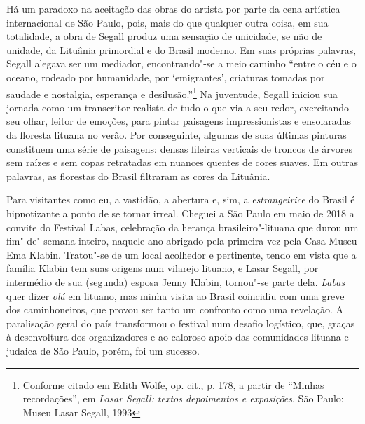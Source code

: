 Há um paradoxo na aceitação das obras do artista por parte da
cena artística internacional de São Paulo, pois, mais do que qualquer
outra coisa, em sua totalidade, a obra de Segall produz uma sensação de
unicidade, se não de unidade, da Lituânia primordial e do Brasil
moderno. Em suas próprias palavras, Segall alegava ser um mediador,
encontrando"-se a meio caminho ``entre o céu e o oceano, rodeado por
humanidade, por `emigrantes', criaturas tomadas por saudade e nostalgia,
esperança e desilusão.''\footnote{Conforme citado em Edith Wolfe, op. cit., p. 178, a partir de
  ``Minhas recordações'', em \textit{Lasar Segall: textos depoimentos e
  exposições}. São Paulo: Museu Lasar Segall, 1993} Na juventude,
Segall iniciou sua jornada como um transcritor realista de tudo o que
via a seu redor, exercitando seu olhar, leitor de emoções, para pintar
paisagens impressionistas e ensolaradas da floresta lituana no verão.
Por conseguinte, algumas de suas últimas pinturas constituem uma série
de paisagens: densas fileiras verticais de troncos de árvores sem raízes
e sem copas retratadas em nuances quentes de cores suaves. Em outras
palavras, as florestas do Brasil filtraram as cores da Lituânia.

Para visitantes como eu, a vastidão, a abertura e, sim, a
\textit{estrangeirice} do Brasil é hipnotizante a ponto de se tornar irreal.
Cheguei a São Paulo em maio de 2018 a convite do Festival Labas,
celebração da herança brasileiro"-lituana que durou um fim"-de"-semana
inteiro, naquele ano abrigado pela primeira vez pela Casa Museu
Ema Klabin. Tratou"-se de um local acolhedor e pertinente, tendo
em vista que a família Klabin tem suas origens num vilarejo lituano, e
Lasar Segall, por intermédio de sua (segunda) esposa Jenny Klabin,
tornou"-se parte dela. \textit{Labas} quer dizer \textit{olá} em lituano, mas
minha visita ao Brasil coincidiu com uma greve dos caminhoneiros, que
provou ser tanto um confronto como uma revelação. A paralisação geral do
país transformou o festival num desafio logístico, que, graças à
desenvoltura dos organizadores e ao caloroso apoio das comunidades
lituana e judaica de São Paulo, porém, foi um sucesso. 

